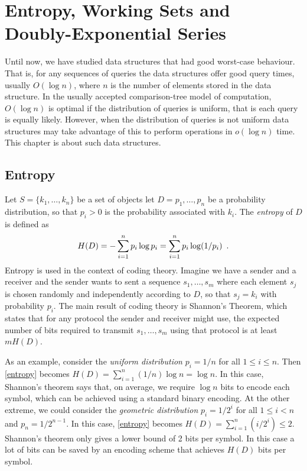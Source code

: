 \newcommand{\dpth}{\mathrm{depth}}

\chapter{Entropy, Working Sets and Doubly-Exponential Series}


 Until now, we have studied data structures that had good worst-case
behaviour.  That is, for any sequences of queries the data structures
offer good query times, usually $O(\log n)$, where $n$ is the number
of elements stored in the data structure.  In the usually accepted
comparison-tree model of computation, $O(\log n)$ is optimal if the
distribution of queries is uniform, that is each query is equally
likely.  However, when the distribution of queries is not uniform data
structures may take advantage of this to perform operations in $o(\log
n)$ time.  This chapter is about such data structures.


\section{Entropy}

Let $S=\{k_1,\ldots,k_n\}$ be a set of objects let $D=p_1,\ldots,p_n$
be a probability distribution, so that $p_i>0$ is the probability
associated with $k_i$.  The \emph{entropy} of $D$ is defined as
\begin{equation}
H(D) = -\sum_{i=1}^np_i\log p_i = \sum_{i=1}^np_i\log(1/p_i) \enspace .
	\eqlabel{entropy}
\end{equation}
Entropy is used in the context of coding theory.  Imagine we have a
sender and a receiver and the sender wants to sent a sequence
$s_1,\ldots,s_m$ where each element $s_j$ is chosen randomly and
independently according to $D$, so that $s_j=k_i$ with probability
$p_i$.  The main result of coding theory is Shannon's Theorem, which
states that for any protocol the sender and receiver might use, the
expected number of bits required to transmit $s_1,\ldots,s_m$ using
that protocol is at least $mH(D)$.

As an example, consider the \emph{uniform distribution} $p_i=1/n$ for
all $1\le i\le n$.  Then \eqref{entropy} becomes
$H(D)=\sum_{i=1}^n(1/n)\log n=\log n$.  In this case, Shannon's
theorem says that, on average, we require $\log n$ bits to encode each
symbol, which can be achieved using a standard binary encoding.  At
the other extreme, we could consider the \emph{geometric distribution}
$p_i=1/2^i$ for all $1\le i< n$ and $p_n=1/2^{n-1}$.  In this case,
\eqref{entropy} becomes $H(D)=\sum_{i=1}^n(i/{2^i})\le 2$.  Shannon's
theorem only gives a lower bound of 2 bits per symbol.  In this case a
lot of bits can be saved by an encoding scheme that achieves $H(D)$
bits per symbol.


